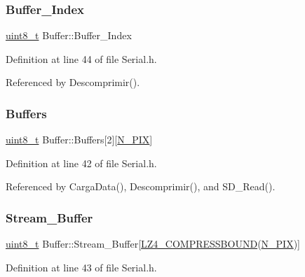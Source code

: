 \subsubsection{\texorpdfstring{Buffer\+\_\+\+Index}{Buffer\_Index}}
{\footnotesize\ttfamily \hyperlink{RegsLPC1769_8h_aba7bc1797add20fe3efdf37ced1182c5}{uint8\+\_\+t} Buffer\+::\+Buffer\+\_\+\+Index}



Definition at line 44 of file Serial.\+h.



Referenced by Descomprimir().

\mbox{\label{structBuffer_aa46fd86a8467fd9c22e27aecd2ce5a6c}} 
\subsubsection{\texorpdfstring{Buffers}{Buffers}}
{\footnotesize\ttfamily \hyperlink{RegsLPC1769_8h_aba7bc1797add20fe3efdf37ced1182c5}{uint8\+\_\+t} Buffer\+::\+Buffers\mbox{[}2\mbox{]}\mbox{[}\hyperlink{Serial_8h_af6da69ccda8aa07b1fafe1db53bd4051}{N\+\_\+\+P\+IX}\mbox{]}}



Definition at line 42 of file Serial.\+h.



Referenced by Carga\+Data(), Descomprimir(), and S\+D\+\_\+\+Read().

\mbox{\label{structBuffer_a8f92727e7b44eade72f7770483f92e40}} 
\subsubsection{\texorpdfstring{Stream\+\_\+\+Buffer}{Stream\_Buffer}}
{\footnotesize\ttfamily \hyperlink{RegsLPC1769_8h_aba7bc1797add20fe3efdf37ced1182c5}{uint8\+\_\+t} Buffer\+::\+Stream\+\_\+\+Buffer\mbox{[}\hyperlink{lz4_8h_a2453a423fd34640a0afbbf57ed0a5399}{L\+Z4\+\_\+\+C\+O\+M\+P\+R\+E\+S\+S\+B\+O\+U\+ND}(\hyperlink{Serial_8h_af6da69ccda8aa07b1fafe1db53bd4051}{N\+\_\+\+P\+IX})\mbox{]}}



Definition at line 43 of file Serial.\+h.



